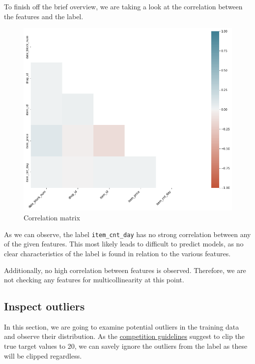 To finish off the brief overview, we are taking a look at the correlation between the features and the label.

\begin{figure}
\centering
  \includegraphics[width=0.85\linewidth]{external_content/graphs/corr_matrix.png}
\captionsetup{justification=centering}
\caption{Correlation matrix}
\label{corr_matrix}
\end{figure}

\noindent As we can observe, the label \texttt{item\_cnt\_day} has no strong correlation between any of the given features. 
This most likely leads to difficult to predict models, as no clear characteristics of the label is found in relation to the various features.

Additionally, no high correlation between features is observed. Therefore, we are not checking any features for multicollinearity at this point. \cite{MultivariateStatistics}

\subsection{Inspect outliers}

In this section, we are going to examine potential outliers in the training data and observe their distribution. As the \href{https://www.kaggle.com/c/competitive-data-science-predict-future-sales/overview/evaluation}{competition guidelines} suggest to clip the true target values to 20, we can savely ignore the outliers from the label as these will be clipped regardless.

